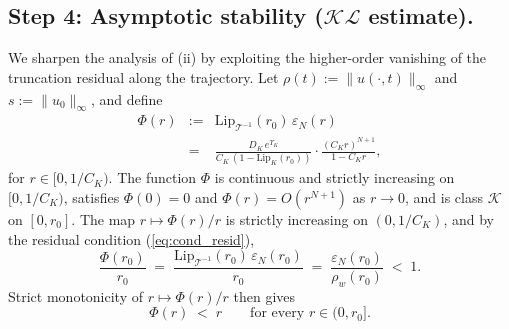 \documentclass[10pt,a4paper]{amsart}
\newcommand{\Tcal}{\mathcal{T}}
\newcommand{\Lipk}{\mathrm{Lip}_K}
\newcommand{\LipT}{\mathrm{Lip}_{\Tcal^{-1}}}
\newcommand{\eps}{\varepsilon}
\begin{document}
\subsection*{Step 4: Asymptotic stability ($\mathcal{KL}$ estimate).}

We sharpen the analysis of (ii) by exploiting the higher-order vanishing of the truncation residual along the trajectory. Let $\rho(t) := \|u(\cdot,t)\|_\infty$ and $s := \|u_0\|_\infty$, and define
\begin{eqnarray}
\Phi(r) &:=& \LipT(r_0)\,\eps_N(r) \nonumber \\
&=& \frac{D_K\,e^{\Upsilon_K}}{C_K\,(1 - \Lipk(r_0))}\cdot\frac{(C_K r)^{N+1}}{1 - C_K r},
\label{eq:Phidef}
\end{eqnarray}
for $r \in [0, 1/C_K)$.
The function $\Phi$ is continuous and strictly increasing on $[0, 1/C_K)$, satisfies $\Phi(0) = 0$ and $\Phi(r) = O(r^{N+1})$ as $r \to 0$, and is class $\mathcal{K}$ on $[0, r_0]$. The map $r \mapsto \Phi(r)/r$ is strictly increasing on $(0, 1/C_K)$, and by the residual condition (\ref{eq:cond_resid}),
\begin{equation}
\frac{\Phi(r_0)}{r_0} \;=\; \frac{\LipT(r_0)\,\eps_N(r_0)}{r_0} \;=\; \frac{\eps_N(r_0)}{\rho_w(r_0)} \;<\; 1.
\label{eq:Phi_over_r_at_r0}
\end{equation}
Strict monotonicity of $r \mapsto \Phi(r)/r$ then gives
\begin{equation}
\Phi(r) \;<\; r \qquad \text{for every } r \in (0, r_0].
\label{eq:Phisubunity}
\end{equation}
\end{document}
